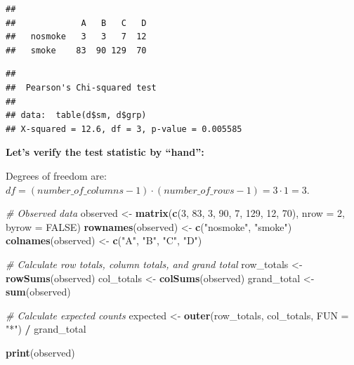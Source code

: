 \documentclass[
]{book}
\newenvironment{Shaded}{\begin{snugshade}}{\end{snugshade}}
\newcommand{\AttributeTok}[1]{\textcolor[rgb]{0.13,0.29,0.53}{#1}}
\newcommand{\CommentTok}[1]{\textcolor[rgb]{0.56,0.35,0.01}{\textit{#1}}}
\newcommand{\ConstantTok}[1]{\textcolor[rgb]{0.56,0.35,0.01}{#1}}
\newcommand{\DecValTok}[1]{\textcolor[rgb]{0.00,0.00,0.81}{#1}}
\newcommand{\FunctionTok}[1]{\textcolor[rgb]{0.13,0.29,0.53}{\textbf{#1}}}
\newcommand{\NormalTok}[1]{#1}
\newcommand{\OtherTok}[1]{\textcolor[rgb]{0.56,0.35,0.01}{#1}}
\newcommand{\SpecialCharTok}[1]{\textcolor[rgb]{0.81,0.36,0.00}{\textbf{#1}}}
\newcommand{\StringTok}[1]{\textcolor[rgb]{0.31,0.60,0.02}{#1}}
\begin{document}
\begin{verbatim}
##          
##             A   B   C   D
##   nosmoke   3   3   7  12
##   smoke    83  90 129  70
\end{verbatim}

\begin{Shaded}
\end{Shaded}

\begin{verbatim}
## 
##  Pearson's Chi-squared test
## 
## data:  table(d$sm, d$grp)
## X-squared = 12.6, df = 3, p-value = 0.005585
\end{verbatim}

\textbf{Let's verify the test statistic by ``hand'':}

Degrees of freedom are:
\(df = (number\_of\_columns - 1) \cdot (number\_of\_rows - 1) = 3 \cdot 1 = 3\).

\begin{Shaded}
\begin{Highlighting}[]
\CommentTok{\# Observed data}
\NormalTok{observed }\OtherTok{\textless{}{-}} \FunctionTok{matrix}\NormalTok{(}\FunctionTok{c}\NormalTok{(}\DecValTok{3}\NormalTok{, }\DecValTok{83}\NormalTok{, }\DecValTok{3}\NormalTok{, }\DecValTok{90}\NormalTok{, }\DecValTok{7}\NormalTok{, }\DecValTok{129}\NormalTok{, }\DecValTok{12}\NormalTok{, }\DecValTok{70}\NormalTok{), }\AttributeTok{nrow =} \DecValTok{2}\NormalTok{, }\AttributeTok{byrow =} \ConstantTok{FALSE}\NormalTok{)}
\FunctionTok{rownames}\NormalTok{(observed) }\OtherTok{\textless{}{-}} \FunctionTok{c}\NormalTok{(}\StringTok{"nosmoke"}\NormalTok{, }\StringTok{"smoke"}\NormalTok{)}
\FunctionTok{colnames}\NormalTok{(observed) }\OtherTok{\textless{}{-}} \FunctionTok{c}\NormalTok{(}\StringTok{"A"}\NormalTok{, }\StringTok{"B"}\NormalTok{, }\StringTok{"C"}\NormalTok{, }\StringTok{"D"}\NormalTok{)}

\CommentTok{\# Calculate row totals, column totals, and grand total}
\NormalTok{row\_totals }\OtherTok{\textless{}{-}} \FunctionTok{rowSums}\NormalTok{(observed)}
\NormalTok{col\_totals }\OtherTok{\textless{}{-}} \FunctionTok{colSums}\NormalTok{(observed)}
\NormalTok{grand\_total }\OtherTok{\textless{}{-}} \FunctionTok{sum}\NormalTok{(observed)}

\CommentTok{\# Calculate expected counts}
\NormalTok{expected }\OtherTok{\textless{}{-}} \FunctionTok{outer}\NormalTok{(row\_totals, col\_totals, }\AttributeTok{FUN =} \StringTok{"*"}\NormalTok{) }\SpecialCharTok{/}\NormalTok{ grand\_total}

\FunctionTok{print}\NormalTok{(observed)}
\end{Highlighting}
\end{Shaded}
\end{document}
